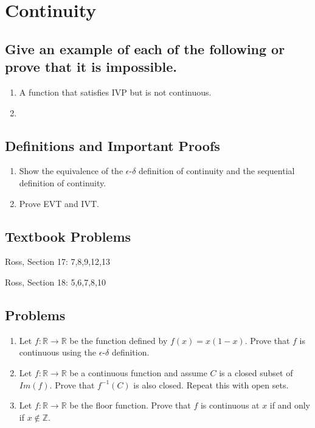 \documentclass{article}
\theoremstyle{definition}
\newcommand{\Z}{\mathbb{Z}}
\newcommand{\R}{\mathbb{R}}
\begin{document}
\newpage

\section{Continuity}

\subsection{Give an example of each of the following or prove that it is impossible.}

\begin{enumerate}
    \item A function that satisfies IVP but is not continuous.
    \item 
\end{enumerate}

\subsection{Definitions and Important Proofs}

\begin{enumerate}
    \item Show the equivalence of the $\epsilon$-$\delta$ definition of continuity and the sequential definition of continuity.
    \item Prove EVT and IVT.
\end{enumerate}

\subsection{Textbook Problems}

Ross, Section 17: 7,8,9,12,13

Ross, Section 18: 5,6,7,8,10

\subsection{Problems}

\begin{enumerate}
    \item Let $f: \R \xrightarrow{} \R$ be the function defined by $f(x) = x(1-x)$. Prove that $f$ is continuous using the $\epsilon$-$\delta$ definition.

    \item Let $f: \R \xrightarrow{} \R$ be a continuous function and assume $C$ is a closed subset of $Im(f)$. Prove that $f^{-1}(C)$ is also closed. Repeat this with open sets.
    
    \item Let $f: \R \xrightarrow{} \R$ be the floor function. Prove that $f$ is continuous at $x$ if and only if $x \notin \Z$.

\end{enumerate}
\end{document}
